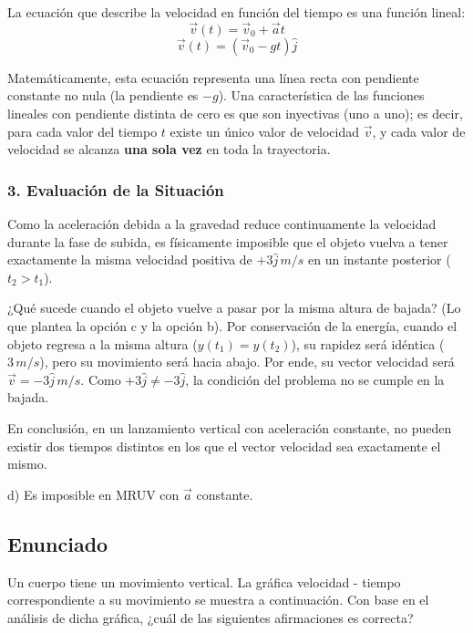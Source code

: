 \documentclass[12pt, a4paper]{article}
\begin{document}
La ecuación que describe la velocidad en función del tiempo es una función lineal:
$$ \vec{v}(t) = \vec{v}_0 + \vec{a}t $$
$$ \vec{v}(t) = (\vec{v}_0 - gt)\hat{j} $$

Matemáticamente, esta ecuación representa una línea recta con pendiente constante no nula (la pendiente es $-g$). Una característica de las funciones lineales con pendiente distinta de cero es que son inyectivas (uno a uno); es decir, para cada valor del tiempo $t$ existe un único valor de velocidad $\vec{v}$, y cada valor de velocidad se alcanza \textbf{una sola vez} en toda la trayectoria.

\subsubsection*{3. Evaluación de la Situación}
Como la aceleración debida a la gravedad reduce continuamente la velocidad durante la fase de subida, es físicamente imposible que el objeto vuelva a tener exactamente la misma velocidad positiva de $+3\hat{j} \, \si{m/s}$ en un instante posterior ($t_2 > t_1$).

¿Qué sucede cuando el objeto vuelve a pasar por la misma altura de bajada? (Lo que plantea la opción c y la opción b).
Por conservación de la energía, cuando el objeto regresa a la misma altura ($y(t_1) = y(t_2)$), su rapidez será idéntica ($3 \, \si{m/s}$), pero su movimiento será hacia abajo. Por ende, su vector velocidad será $\vec{v} = -3\hat{j} \, \si{m/s}$.
Como $+3\hat{j} \neq -3\hat{j}$, la condición del problema no se cumple en la bajada.

En conclusión, en un lanzamiento vertical con aceleración constante, no pueden existir dos tiempos distintos en los que el vector velocidad sea exactamente el mismo.

\begin{tcolorbox}[colback=green!5!white, colframe=green!50!black, title=Respuesta Final]
\centering \Large d) Es imposible en MRUV con $\vec{a}$ constante.
\end{tcolorbox}

\newpage

\subsection*{Enunciado}
Un cuerpo tiene un movimiento vertical. La gráfica velocidad - tiempo correspondiente a su movimiento se muestra a continuación. Con base en el análisis de dicha gráfica, ¿cuál de las siguientes afirmaciones es correcta?
\end{document}
